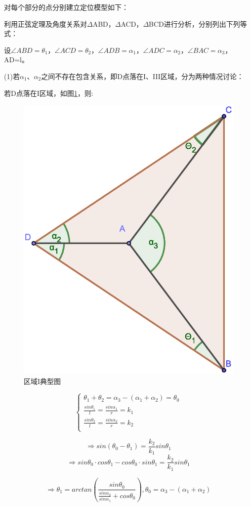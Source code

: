 \documentclass{ctexart}
\begin{document}
对每个部分的点分别建立定位模型如下：

利用正弦定理及角度关系对$\Delta$ABD，$\Delta$ACD，$\Delta$BCD进行分析，分别列出下列等式：

设$\angle ABD=\theta_1$，$\angle ACD=\theta_2$，$\angle ADB=\alpha_1$，$\angle ADC=\alpha_2$，$\angle BAC=\alpha_3$，AD=l。

(1)若$\alpha_1$、$\alpha_2$之间不存在包含关系，即D点落在I、III区域，分为两种情况讨论：

若D点落在I区域，如图\ref{区域I典型图}，则:

\begin{figure}[H]
  \centering
  \includegraphics[width=0.40\linewidth]{pic/case1++.eps}
  \caption{区域I典型图}
  \label{区域I典型图}
  \end{figure} 

\begin{equation}
    \left\{
              \begin{array}{ll}
                \theta_1+\theta_2=\alpha_3-(\alpha_1+\alpha_2)=\theta_0\\
                \frac{sin\theta_1}{l}=\frac{sin\alpha_1}{r}=k_1\\
                \frac{sin\theta_2}{l}=\frac{sin\alpha_2}{r}=k_2\\

              \end{array}
            \right.
\end{equation}

\[
    \Rightarrow sin(\theta_0-\theta_1)=\frac{k_2}{k_1}sin\theta_1
\]
\[
    \Rightarrow sin\theta_0 \cdot cos\theta_1-cos\theta_0 \cdot sin\theta_1=\frac{k_2}{k_1}sin\theta_1
\]

\[
    \Rightarrow \theta_1=arctan(\frac{sin\theta_0}{\frac{sin\alpha_2}{sin\alpha_1}+cos\theta_0}),\theta_0=\alpha_3-(\alpha_1+\alpha_2)
\]
\end{document}
